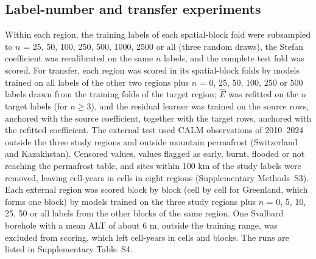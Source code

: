 \subsection{Label-number and transfer experiments}
Within each region, the training labels of each spatial-block fold were subsampled to $n$ = 25, 50, 100, 250, 500, 1000, 2500 or all (three random draws), the Stefan coefficient was recalibrated on the same $n$ labels, and the complete test fold was scored. For transfer, each region was scored in its spatial-block folds by models trained on all labels of the other two regions plus $n$ = 0, 25, 50, 100, 250 or 500 labels drawn from the training folds of the target region; $\hat{E}$ was refitted on the $n$ target labels (for $n\geq3$), and the residual learner was trained on the source rows, anchored with the source coefficient, together with the target rows, anchored with the refitted coefficient. The external test used CALM observations of 2010--2024\cite{Streletskiy2025} outside the three study regions and outside mountain permafrost (Switzerland and Kazakhstan). Censored values, values flagged as early, burnt, flooded or not reaching the permafrost table, and sites within 100 km of the study labels were removed, leaving \nextcy{} cell-years in \nextcells{} cells in eight regions (Supplementary Methods~S3). Each external region was scored block by block (cell by cell for Greenland, which forms one block) by models trained on the three study regions plus $n$ = 0, 5, 10, 25, 50 or all labels from the other blocks of the same region. One Svalbard borehole with a mean ALT of about 6 m, outside the training range, was excluded from scoring, which left \nftScoredRows{} cell-years in \nftScoredCells{} cells and \nftScoredBlocks{} blocks. The runs are listed in Supplementary Table~S4.

